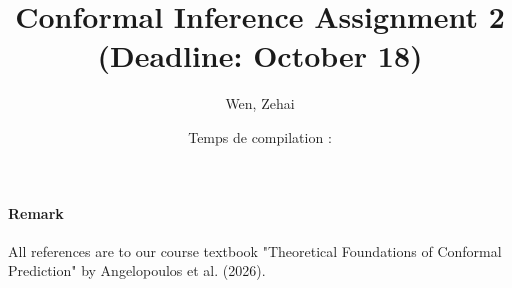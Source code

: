 \documentclass[../../main.tex]{subfiles}
\title{Conformal Inference Assignment 2 \\ (Deadline: October 18)}
\author{Wen, Zehai }
\date{Temps de compilation : \DTMnow}
\begin{document}
\maketitle

\paragraph{Remark}
All references are to our course textbook "Theoretical Foundations of Conformal Prediction"
by Angelopoulos et al. (2026).





\end{document}
